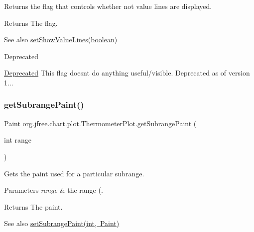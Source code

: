Returns the flag that controls whether not value lines are displayed.

\begin{DoxyReturn}{Returns}
The flag.
\end{DoxyReturn}
\begin{DoxySeeAlso}{See also}
\mbox{\hyperlink{classorg_1_1jfree_1_1chart_1_1plot_1_1_thermometer_plot_aacc32926a64c662cf5560bb0cf6f770b}{set\+Show\+Value\+Lines(boolean)}}
\end{DoxySeeAlso}
\begin{DoxyRefDesc}{Deprecated}
\item[\mbox{\hyperlink{deprecated__deprecated000092}{Deprecated}}]This flag doesn\textquotesingle{}t do anything useful/visible. Deprecated as of version 1... \end{DoxyRefDesc}
\mbox{\label{classorg_1_1jfree_1_1chart_1_1plot_1_1_thermometer_plot_ad8e3a6c3ae6832907c36158d77df0e30}} 
\subsubsection{\texorpdfstring{get\+Subrange\+Paint()}{getSubrangePaint()}}
{\footnotesize\ttfamily Paint org.\+jfree.\+chart.\+plot.\+Thermometer\+Plot.\+get\+Subrange\+Paint (\begin{DoxyParamCaption}\item[{int}]{range }\end{DoxyParamCaption})}

Gets the paint used for a particular subrange.


\begin{DoxyParams}{Parameters}
{\em range} & the range (.\\
\hline
\end{DoxyParams}
\begin{DoxyReturn}{Returns}
The paint.
\end{DoxyReturn}
\begin{DoxySeeAlso}{See also}
\mbox{\hyperlink{classorg_1_1jfree_1_1chart_1_1plot_1_1_thermometer_plot_a0cee6f90f5442bda141dc407e0af0bdd}{set\+Subrange\+Paint(int, Paint)}} 
\end{DoxySeeAlso}
\mbox{\label{classorg_1_1jfree_1_1chart_1_1plot_1_1_thermometer_plot_ac725954b0973477c957c51b0e359fcda}} 
